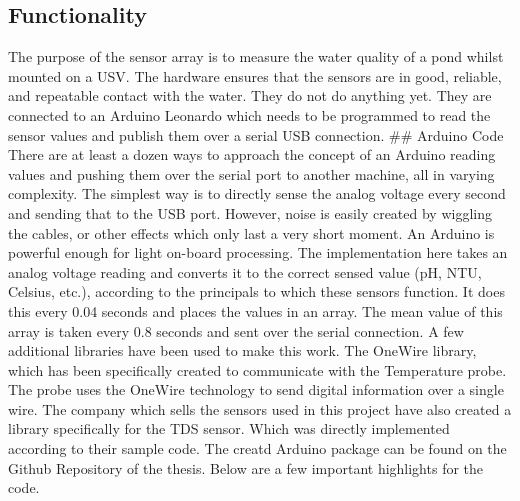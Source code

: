 \documentclass[
  english,
  man,floatsintext]{apa6}
\begin{document}
\hypertarget{functionality}{%
\subsection{Functionality}\label{functionality}}

The purpose of the sensor array is to measure the water quality of a pond whilst mounted on a USV. The hardware ensures that the sensors are in good, reliable, and repeatable contact with the water. They do not do anything yet. They are connected to an Arduino Leonardo which needs to be programmed to read the sensor values and publish them over a serial USB connection.
\#\# Arduino Code
There are at least a dozen ways to approach the concept of an Arduino reading values and pushing them over the serial port to another machine, all in varying complexity. The simplest way is to directly sense the analog voltage every second and sending that to the USB port. However, noise is easily created by wiggling the cables, or other effects which only last a very short moment.
An Arduino is powerful enough for light on-board processing. The implementation here takes an analog voltage reading and converts it to the correct sensed value (pH, NTU, Celsius, etc.), according to the principals to which these sensors function. It does this every 0.04 seconds and places the values in an array. The mean value of this array is taken every 0.8 seconds and sent over the serial connection.
A few additional libraries have been used to make this work. The OneWire library, which has been specifically created to communicate with the Temperature probe. The probe uses the OneWire technology to send digital information over a single wire.
The company which sells the sensors used in this project have also created a library specifically for the TDS sensor. Which was directly implemented according to their sample code.
The creatd Arduino package can be found on the Github Repository of the thesis. Below are a few important highlights for the code.

\newpage
\end{document}
